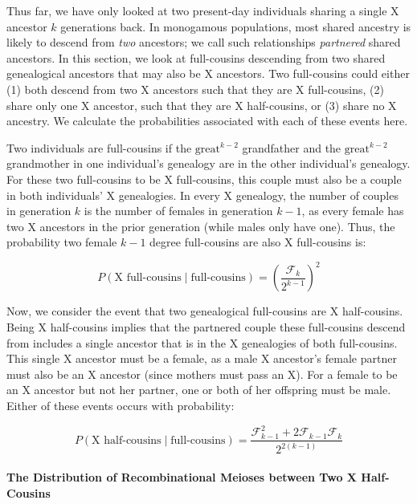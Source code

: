 \documentclass[9pt,twocolumn,twoside]{gsajnl}
\begin{document}
Thus far, we have only looked at two present-day individuals sharing a single X
ancestor $k$ generations back. In monogamous populations, most shared ancestry
is likely to descend from \emph{two} ancestors; we call such relationships
\emph{partnered} shared ancestors. In this section, we look at full-cousins
descending from two shared genealogical ancestors that may also be X ancestors.
Two full-cousins could either (1) both descend from two X ancestors such that
they are X full-cousins, (2) share only one X ancestor, such that they are X
half-cousins, or (3) share no X ancestry. We calculate the probabilities
associated with each of these events here.

Two individuals are full-cousins if the $\text{great}^{k-2}$ grandfather and
the $\text{great}^{k-2}$ grandmother in one individual's genealogy are in the
other individual's genealogy. For these two full-cousins to be X full-cousins,
this couple must also be a couple in both individuals' X genealogies. In every
X genealogy, the number of couples in generation $k$ is the number of females
in generation $k-1$, as every female has two X ancestors in the prior
generation (while males only have one). Thus, the probability two female $k-1$
degree full-cousins are also X full-cousins is:

\begin{equation}
  P(\text{X full-cousins} \; | \; \text{full-cousins}) = 
    \left( \frac{\mathcal{F}_k}{2^{k-1}} \right)^2
\end{equation}


Now, we consider the event that two genealogical full-cousins are X
half-cousins. Being X half-cousins implies that the partnered couple these
full-cousins descend from includes a single ancestor that is in the X
genealogies of both full-cousins. This single X ancestor must be a female, as a
male X ancestor's female partner must also be an X ancestor (since mothers must
pass an X). For a female to be an X ancestor but not her partner, one or both
of her offspring must be male. Either of these events occurs with probability:

\begin{equation}
  P(\text{X half-cousins} \;|\; \text{full-cousins}) = \frac{\mathcal{F}_{k-1}^2 + 2 \mathcal{F}_{k-1} \mathcal{F}_k}{2^{2(k-1)}}
\end{equation}

\paragraph{The Distribution of Recombinational Meioses between Two X Half-Cousins}
\label{p:two-cousins-rms}
\end{document}
